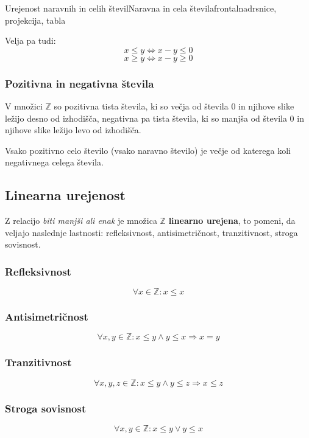 \begin{priprava}{6}{}{Urejenost naravnih in celih števil}{Naravna in cela števila}{frontalna}{drsnice, projekcija, tabla}
        ~

    
        Velja pa tudi:
        $$x\leq y \Leftrightarrow x-y\leq 0 $$
        $$x\geq y \Leftrightarrow x-y\geq 0 $$


    \subsubsection*{Pozitivna in negativna števila}
        V množici $\mathbb{Z}$ so pozitivna tista števila, ki so večja od števila $0$ 
        in njihove slike ležijo desno od izhodišča, 
        negativna pa tista števila, ki so manjša od števila $0$ 
        in njihove slike ležijo levo od izhodišča.
    
        Vsako pozitivno celo število (vsako naravno število) je večje od katerega koli negativnega celega števila.
    



    


        \subsection{Linearna urejenost}

    
        Z relacijo \textit{biti manjši ali enak} je množica $\mathbb{Z}$ \textbf{linearno urejena}, 
        to pomeni, da veljajo naslednje lastnosti: refleksivnost, antisimetričnost, tranzitivnost, stroga sovisnost.
    
        \begin{multicols}{2}
    
        \subsubsection*{Refleksivnost}
        $$\forall x\in\mathbb{Z}: x\leq x$$
    

        \subsubsection*{Antisimetričnost}
        $$\forall x,y\in\mathbb{Z}: x\leq y \land y\leq x \Rightarrow x=y$$
    

        \subsubsection*{Tranzitivnost}
        $$\forall x,y,z\in\mathbb{Z}: x\leq y \land y\leq z \Rightarrow x\leq z$$
    

        \subsubsection*{Stroga sovisnost}
        $$\forall x,y\in\mathbb{Z}: x\leq y \lor y\leq x$$


\end{multicols}
\end{priprava}
